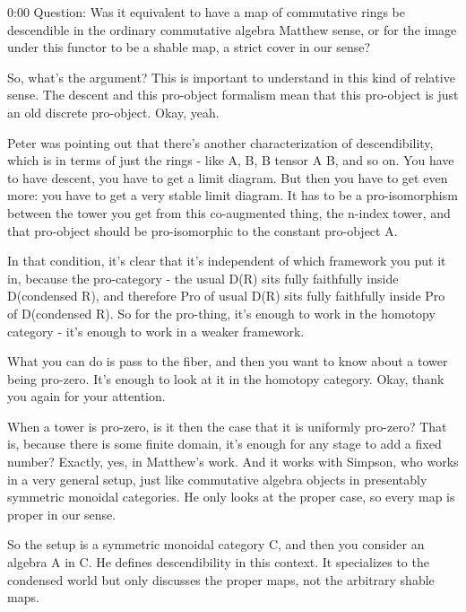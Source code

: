 \begin{unfinished}{0:00}
Question: Was it equivalent to have a map of commutative rings be descendible in the ordinary commutative algebra Matthew sense, or for the image under this functor to be a shable map, a strict cover in our sense?

So, what's the argument? This is important to understand in this kind of relative sense. The descent and this pro-object formalism mean that this pro-object is just an old discrete pro-object. Okay, yeah.

Peter was pointing out that there's another characterization of descendibility, which is in terms of just the rings - like A, B, B tensor A B, and so on. You have to have descent, you have to get a limit diagram. But then you have to get even more: you have to get a very stable limit diagram. It has to be a pro-isomorphism between the tower you get from this co-augmented thing, the n-index tower, and that pro-object should be pro-isomorphic to the constant pro-object A.

In that condition, it's clear that it's independent of which framework you put it in, because the pro-category - the usual D(R) sits fully faithfully inside D(condensed R), and therefore Pro of usual D(R) sits fully faithfully inside Pro of D(condensed R). So for the pro-thing, it's enough to work in the homotopy category - it's enough to work in a weaker framework.

What you can do is pass to the fiber, and then you want to know about a tower being pro-zero. It's enough to look at it in the homotopy category. Okay, thank you again for your attention. 

When a tower is pro-zero, is it then the case that it is uniformly pro-zero? That is, because there is some finite domain, it's enough for any stage to add a fixed number? Exactly, yes, in Matthew's work. And it works with Simpson, who works in a very general setup, just like commutative algebra objects in presentably symmetric monoidal categories. He only looks at the proper case, so every map is proper in our sense.

So the setup is a symmetric monoidal category C, and then you consider an algebra A in C. He defines descendibility in this context. It specializes to the condensed world but only discusses the proper maps, not the arbitrary shable maps.

\end{unfinished}